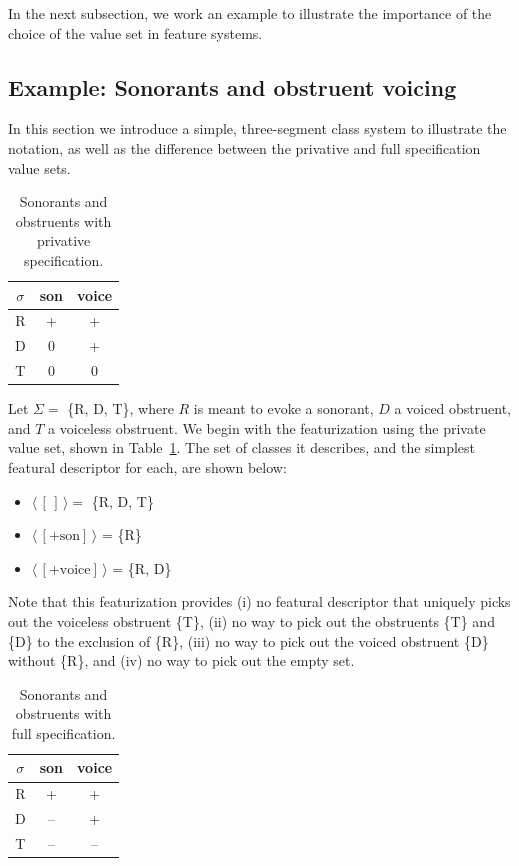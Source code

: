 \documentclass[12pt, oneside]{article}   	%
\begin{document}
In the next subsection, we work an example to illustrate the importance of the choice of the value set in feature systems.

\subsection{Example: Sonorants and obstruent voicing}

In this section we introduce a simple, three-segment class system to illustrate the notation, as well as the difference between the privative and full specification value sets.

\begin{table}[h]
	\centering
	\begin{tabular} {|c||c|c|}
		\hline
		$\sigma$ & son & voice \\ \hline
		R & + & + \\
		D & 0 & + \\
		T & 0 & 0 \\
		\hline
	\end{tabular}
	\caption{Sonorants and obstruents with privative specification.}
	\label{table:privative}
\end{table}

Let $\Sigma =$ \{R, D, T\}, where $R$ is meant to evoke a sonorant, $D$ a voiced obstruent, and $T$ a voiceless obstruent. We begin with the featurization using the private value set, shown in Table~\ref{table:privative}. The set of classes it describes, and the simplest featural descriptor for each, are shown below:

\begin{itemize}
  \item $\langle \, [\,] \, \rangle = $ \{R, D, T\}
  \item $\langle \, [+\text{son}] \, \rangle$ = \{R\}
  \item $\langle \, [+\text{voice}] \, \rangle$ = \{R, D\}
\end{itemize}
Note that this featurization provides (i) no featural descriptor that uniquely picks out the voiceless obstruent \{T\}, (ii) no way to pick out the obstruents \{T\} and \{D\} to the exclusion of \{R\}, (iii) no way to pick out the voiced obstruent \{D\} without \{R\}, and (iv) no way to pick out the empty set.

\begin{table}[h]
	\centering
	\begin{tabular} {|c||c|c|}
		\hline
		$\sigma$ & son & voice \\ \hline
		R & + & + \\
		D & -- & + \\
		T & -- & -- \\
		\hline
	\end{tabular}
	\caption{Sonorants and obstruents with full specification.}
	\label{table:full}
\end{table}
\end{document}
